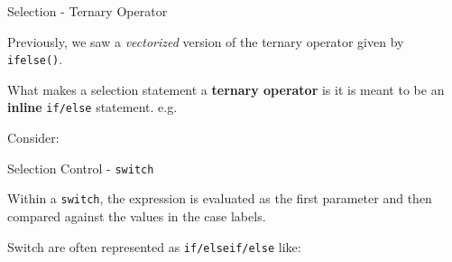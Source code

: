 \begin{frame}[fragile]{Selection - Ternary Operator}

Previously, we saw a \emph{vectorized} version of the ternary operator
given by \texttt{ifelse()}.

What makes a selection statement a \textbf{ternary operator} is it is
meant to be an \textbf{inline} \texttt{if/else} statement. e.g.

\begin{Shaded}
\begin{Highlighting}[]
  
\end{Highlighting}
\end{Shaded}

Consider:

\begin{Shaded}
\begin{Highlighting}[]
\StringTok{ }
\StringTok{ }\StringTok{ }\NormalTok{) }  
\StringTok{ }\StringTok{ }\NormalTok{)                   }
\end{Highlighting}
\end{Shaded}

\end{frame}

\begin{frame}[fragile]{Selection Control - \texttt{switch}}

Within a \texttt{switch}, the expression is evaluated as the first
parameter and then compared against the values in the case labels.

\begin{Shaded}
\begin{Highlighting}[]
        
        
\NormalTok{)}
\end{Highlighting}
\end{Shaded}

Switch are often represented as \texttt{if/elseif/else} like:

\begin{Shaded}
\begin{Highlighting}[]
\StringTok{ }
\StringTok{ }
\NormalTok{\}}
\end{Highlighting}
\end{Shaded}

\end{frame}

